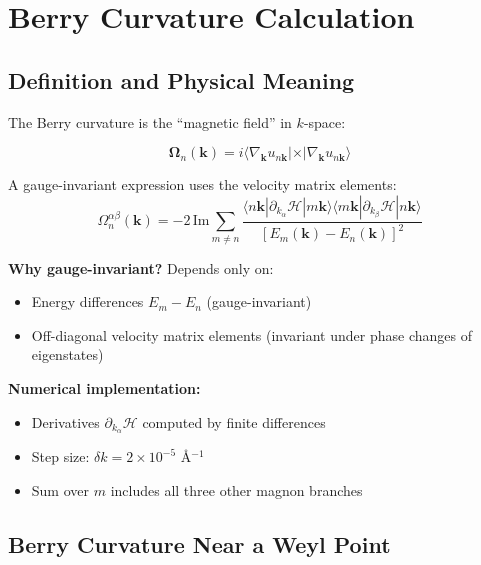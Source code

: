 \documentclass[11pt,letterpaper]{article}
\begin{document}
\section{Berry Curvature Calculation}

\subsection{Definition and Physical Meaning}

The Berry curvature is the ``magnetic field'' in $k$-space:

\begin{equation}
\bm{\Omega}_n(\bm{k}) = i \langle \nabla_{\bm{k}} u_{n\bm{k}} | \times | \nabla_{\bm{k}} u_{n\bm{k}} \rangle
\end{equation}

\begin{derivation}[title={Kubo Formula for Berry Curvature}]
A gauge-invariant expression uses the velocity matrix elements:
\begin{equation}
\boxed{
\Omega_n^{\alpha\beta}(\bm{k}) = -2 \, \text{Im} \sum_{m \neq n}
\frac{\langle n\bm{k} | \partial_{k_\alpha} \mathcal{H} | m\bm{k} \rangle
      \langle m\bm{k} | \partial_{k_\beta} \mathcal{H} | n\bm{k} \rangle}
     {[E_m(\bm{k}) - E_n(\bm{k})]^2}
}
\end{equation}

\textbf{Why gauge-invariant?} Depends only on:
\begin{itemize}
    \item Energy differences $E_m - E_n$ (gauge-invariant)
    \item Off-diagonal velocity matrix elements (invariant under phase changes of eigenstates)
\end{itemize}

\textbf{Numerical implementation:}
\begin{itemize}
    \item Derivatives $\partial_{k_\alpha} \mathcal{H}$ computed by finite differences
    \item Step size: $\delta k = 2 \times 10^{-5}$ \AA$^{-1}$
    \item Sum over $m$ includes all three other magnon branches
\end{itemize}
\end{derivation}

\subsection{Berry Curvature Near a Weyl Point}
\end{document}
